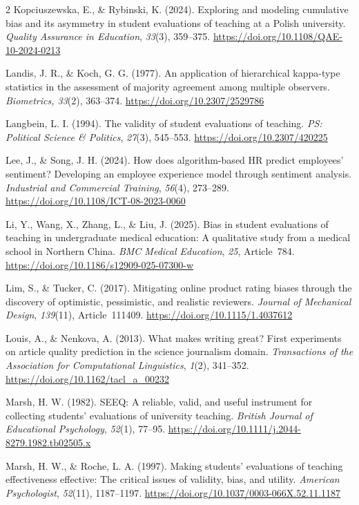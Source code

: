 \documentclass{article}
\begin{document}
\begin{multicols*}{2}
Kopciuszewska, E., \& Rybinski, K. (2024). Exploring and modeling cumulative bias and its asymmetry in student evaluations of teaching at a Polish university. \textit{Quality Assurance in Education}, \textit{33}(3), 359--375. \url{https://doi.org/10.1108/QAE-10-2024-0213}

Landis, J. R., \& Koch, G. G. (1977). An application of hierarchical kappa-type statistics in the assessment of majority agreement among multiple observers. \textit{Biometrics, 33}(2), 363--374. \url{https://doi.org/10.2307/2529786}

Langbein, L. I. (1994). The validity of student evaluations of teaching. \textit{PS: Political Science \& Politics}, \textit{27}(3), 545--553. \url{https://doi.org/10.2307/420225}

Lee, J., \& Song, J. H. (2024). How does algorithm-based HR predict employees’ sentiment? Developing an employee experience model through sentiment analysis. \textit{Industrial and Commercial Training}, \textit{56}(4), 273--289. \url{https://doi.org/10.1108/ICT-08-2023-0060}

Li, Y., Wang, X., Zhang, L., \& Liu, J. (2025). Bias in student evaluations of teaching in undergraduate medical education: A qualitative study from a medical school in Northern China. \textit{BMC Medical Education}, \textit{25}, Article~784. \url{https://doi.org/10.1186/s12909-025-07300-w}

Lim, S., \& Tucker, C. (2017). Mitigating online product rating biases through the discovery of optimistic, pessimistic, and realistic reviewers. \textit{Journal of Mechanical Design}, \textit{139}(11), Article~111409. \url{https://doi.org/10.1115/1.4037612}

Louis, A., \& Nenkova, A. (2013). What makes writing great? First experiments on article quality prediction in the science journalism domain. \textit{Transactions of the Association for Computational Linguistics}, \textit{1}(2), 341--352. \url{https://doi.org/10.1162/tacl_a_00232}

Marsh, H. W. (1982). SEEQ: A reliable, valid, and useful instrument for collecting students' evaluations of university teaching. \textit{British Journal of Educational Psychology}, \textit{52}(1), 77--95. \url{https://doi.org/10.1111/j.2044-8279.1982.tb02505.x}

Marsh, H. W., \& Roche, L. A. (1997). Making students' evaluations of teaching effectiveness effective: The critical issues of validity, bias, and utility. \textit{American Psychologist}, \textit{52}(11), 1187--1197. \url{https://doi.org/10.1037/0003-066X.52.11.1187}


\end{multicols*}
\end{document}
